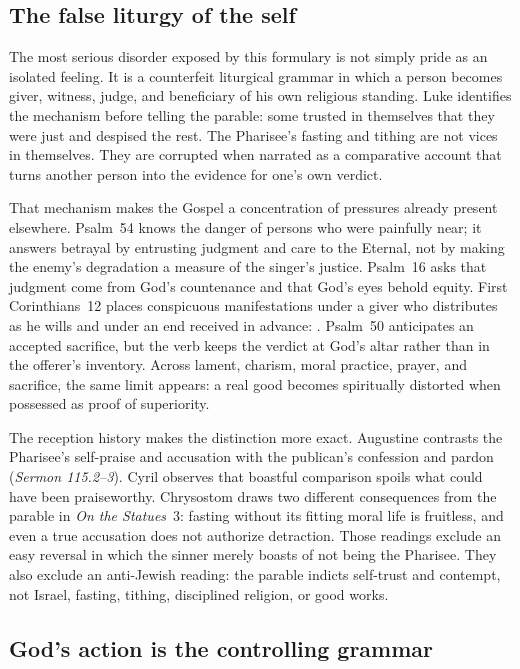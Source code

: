 \subsection*{The false liturgy of the self}

The most serious disorder exposed by this formulary is not simply pride as an
isolated feeling.  It is a counterfeit liturgical grammar in which a person
becomes giver, witness, judge, and beneficiary of his own religious standing.
Luke identifies the mechanism before telling the parable: some trusted in
themselves that they were just and despised the rest.  The Pharisee's fasting
and tithing are not vices in themselves.  They are corrupted when narrated as
a comparative account that turns another person into the evidence for one's
own verdict.

That mechanism makes the Gospel a concentration of pressures already present
elsewhere.  Psalm~54 knows the danger of persons who were painfully near; it
answers betrayal by entrusting judgment and care to the Eternal, not by making
the enemy's degradation a measure of the singer's justice.  Psalm~16 asks
that judgment come from God's countenance and that God's eyes behold equity.
First Corinthians~12 places conspicuous manifestations under a giver who
distributes as he wills and under an end received in advance:
.  Psalm~50 anticipates an accepted sacrifice, but the
verb  keeps the verdict at God's altar rather than in the
offerer's inventory.  Across lament, charism, moral practice, prayer, and
sacrifice, the same limit appears: a real good becomes spiritually distorted
when possessed as proof of superiority.

The reception history makes the distinction more exact.  Augustine contrasts
the Pharisee's self-praise and accusation with the publican's confession and
pardon (\emph{Sermon 115.2--3}).  Cyril observes that boastful comparison
spoils what could have been praiseworthy.  Chrysostom draws two different
consequences from the parable in \emph{On the Statues}~3: fasting without its
fitting moral life is fruitless, and even a true accusation does not authorize
detraction.  Those readings exclude an easy reversal in which the sinner
merely boasts of not being the Pharisee.  They also exclude an anti-Jewish
reading: the parable indicts self-trust and contempt, not Israel, fasting,
tithing, disciplined religion, or good works.

\subsection*{God's action is the controlling grammar}


